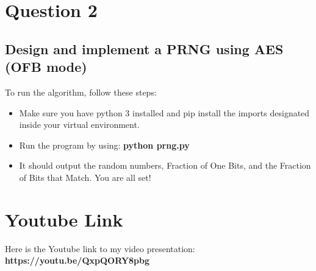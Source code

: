 \documentclass[10pt]{article}
\begin{document}
\vspace{0.2in}
\section{Question 2}
\subsection{Design and implement a PRNG using AES (OFB mode)}
\noindent To run the algorithm, follow these steps:
\begin{itemize}
	\item Make sure you have python 3 installed and pip install the imports designated inside your virtual environment.
	\item Run the program by using: \textbf{python prng.py}
	\item It should output the random numbers, Fraction of One Bits, and the Fraction of Bits that Match. You are all set!
\end{itemize}

\vspace{0.2in}


\section{Youtube Link}
\noindent Here is the Youtube link to my video presentation: \textbf{https://youtu.be/QxpQORY8pbg}
\end{document}
